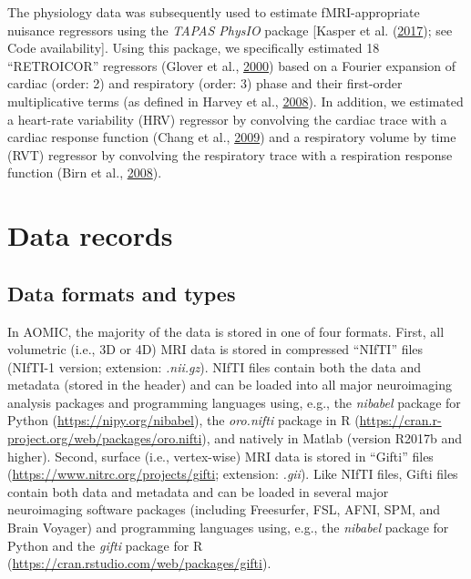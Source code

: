 \documentclass[11pt,american,a4paper,oneside,]{memoir} %
\begin{document}
The physiology data was subsequently used to estimate fMRI-appropriate nuisance regressors using the \emph{TAPAS PhysIO} package {[}Kasper et al. (\protect\hyperlink{ref-Kasper2017-lp}{2017}); see Code availability{]}. Using this package, we specifically estimated 18 ``RETROICOR'' regressors (Glover et al., \protect\hyperlink{ref-Glover2000-or}{2000}) based on a Fourier expansion of cardiac (order: 2) and respiratory (order: 3) phase and their first-order multiplicative terms (as defined in Harvey et al., \protect\hyperlink{ref-Harvey2008-nt}{2008}). In addition, we estimated a heart-rate variability (HRV) regressor by convolving the cardiac trace with a cardiac response function (Chang et al., \protect\hyperlink{ref-Chang2009-vu}{2009}) and a respiratory volume by time (RVT) regressor by convolving the respiratory trace with a respiration response function (Birn et al., \protect\hyperlink{ref-Birn2008-ti}{2008}).

\hypertarget{data-records}{%
\section{Data records}\label{data-records}}

\hypertarget{data-formats-and-types}{%
\subsection{Data formats and types}\label{data-formats-and-types}}

In AOMIC, the majority of the data is stored in one of four formats. First, all volumetric (i.e., 3D or 4D) MRI data is stored in compressed ``NIfTI'' files (NIfTI-1 version; extension: \emph{.nii.gz}). NIfTI files contain both the data and metadata (stored in the header) and can be loaded into all major neuroimaging analysis packages and programming languages using, e.g., the \emph{nibabel} package for Python (\url{https://nipy.org/nibabel}), the \emph{oro.nifti} package in R (\url{https://cran.r-project.org/web/packages/oro.nifti}), and natively in Matlab (version R2017b and higher). Second, surface (i.e., vertex-wise) MRI data is stored in ``Gifti'' files (\url{https://www.nitrc.org/projects/gifti}; extension: \emph{.gii}). Like NIfTI files, Gifti files contain both data and metadata and can be loaded in several major neuroimaging software packages (including Freesurfer, FSL, AFNI, SPM, and Brain Voyager) and programming languages using, e.g., the \emph{nibabel} package for Python and the \emph{gifti} package for R (\url{https://cran.rstudio.com/web/packages/gifti}).
\end{document}
